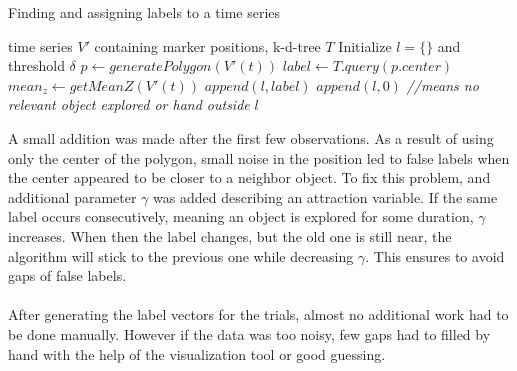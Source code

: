 \begin{algorithm}
	\caption{Finding and assigning labels to a time series}
	\label{label-gen}
	 \begin{algorithmic}[1]
	 	\Require time series $ V' $ containing marker positions,  k-d-tree $ T $
	 	\Begin 
	 	\State Initialize $l = \{\} $ and threshold $ \delta $ 
	 	\State $ p \leftarrow generatePolygon(V'(t)) $
	 	\State $ label \leftarrow T.query(p.center) $
	 	\State $ mean_z \leftarrow getMeanZ(V'(t)) $
	 	\State
	 	 \State $ append(l,label)$ \Else
	 	\State $ append(l,0)$ \textit{ //means no relevant object explored or hand outside} \EndIf
	 	\EndFor
	 	\State \Return $ l $
	 	\End
	 \end{algorithmic}
\end{algorithm}


A small addition was made after the first few observations. As a result of using only the center of the polygon, small noise in the position led to false labels when the center appeared to be closer to a neighbor object. To fix this problem, and additional parameter $ \gamma $ was added describing an attraction variable. If the same label occurs consecutively, meaning an object is explored for some duration, $ \gamma $ increases. When then the label changes, but the old one is still near, the algorithm will stick to the previous one while decreasing $ \gamma $. This ensures to avoid gaps of false labels.\\
\\
After generating the label vectors for the trials, almost no additional work had to be done manually. However if the data was too noisy, few gaps had to filled by hand with the help of the visualization tool or good guessing.

